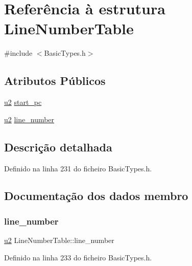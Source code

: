 \hypertarget{structLineNumberTable}{}\section{Referência à estrutura Line\+Number\+Table}
\label{structLineNumberTable}


{\ttfamily \#include $<$Basic\+Types.\+h$>$}

\subsection*{Atributos Públicos}
\begin{DoxyCompactItemize}
\item 
\hyperlink{BasicTypes_8h_a732cde1300aafb73b0ea6c2558a7a54f}{u2} \hyperlink{structLineNumberTable_a16496fea3c8c74d3a54f0104061f0df9}{start\+\_\+pc}
\item 
\hyperlink{BasicTypes_8h_a732cde1300aafb73b0ea6c2558a7a54f}{u2} \hyperlink{structLineNumberTable_a725cc8fff7109848d0a570930b381037}{line\+\_\+number}
\end{DoxyCompactItemize}


\subsection{Descrição detalhada}


Definido na linha 231 do ficheiro Basic\+Types.\+h.



\subsection{Documentação dos dados membro}
\mbox{\label{structLineNumberTable_a725cc8fff7109848d0a570930b381037}} 
\subsubsection{\texorpdfstring{line\+\_\+number}{line\_number}}
{\footnotesize\ttfamily \hyperlink{BasicTypes_8h_a732cde1300aafb73b0ea6c2558a7a54f}{u2} Line\+Number\+Table\+::line\+\_\+number}



Definido na linha 233 do ficheiro Basic\+Types.\+h.




